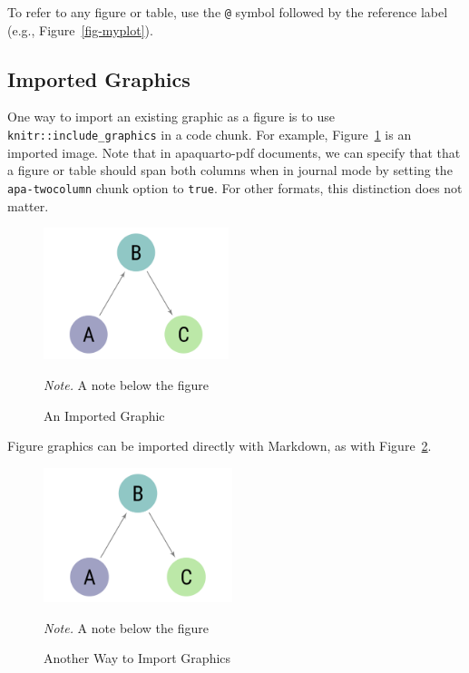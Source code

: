 \documentclass[
  jou,
  floatsintext,
  longtable,
  nolmodern,
  notxfonts,
  notimes,
  colorlinks=true,linkcolor=blue,citecolor=blue,urlcolor=blue]{apa7}
\begin{document}
To refer to any figure or table, use the \texttt{@} symbol followed by
the reference label (e.g., Figure~\ref{fig-myplot}).

\subsection{Imported Graphics}\label{imported-graphics}

One way to import an existing graphic as a figure is to use
\texttt{knitr::include\_graphics} in a code chunk. For example,
Figure~\ref{fig-import1} is an imported image. Note that in
apaquarto-pdf documents, we can specify that that a figure or table
should span both columns when in journal mode by setting the
\texttt{apa-twocolumn} chunk option to \texttt{true}. For other formats,
this distinction does not matter.

\begin{figure}[!htbp]

{\caption{{An Imported Graphic}{\label{fig-import1}}}}

\includegraphics[width=0.48\textwidth,height=\textheight]{sampleimage.png}

{\noindent \emph{Note.} A note below the figure}

\end{figure}

Figure graphics can be imported directly with Markdown, as with
Figure~\ref{fig-import2}.

\begin{figure}[!htbp]

{\caption{{Another Way to Import Graphics}{\label{fig-import2}}}}

\includegraphics[width=0.49\textwidth,height=\textheight]{sampleimage.png}

{\noindent \emph{Note.} A note below the figure}

\end{figure}
\end{document}
